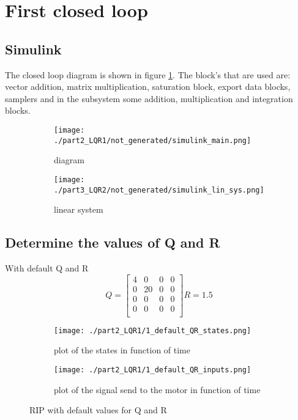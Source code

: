 \section{First closed loop}

\subsection{Simulink}
The closed loop diagram is shown in figure \ref{fig:main_simulink_part3_LQR}. The block's that are used are: vector addition, matrix multiplication, saturation block, export data blocks, samplers and in the subsystem some addition, multiplication and integration blocks.
\begin{figure}[H]
	\centering
	\begin{subfigure}[b]{0.45\textwidth}
		\texttt{[image: ./part2\_LQR1/not\_generated/simulink\_main.png]}
		\caption{diagram}
		
	\end{subfigure}
	\begin{subfigure}[b]{0.45\textwidth}
		\texttt{[image: ./part3\_LQR2/not\_generated/simulink\_lin\_sys.png]}
		\caption{linear system}
	\end{subfigure}
	\caption{}
	\label{fig:main_simulink_part3_LQR}
\end{figure}



\subsection{Determine the values of Q and R}
With default Q and R
$$
Q=\begin{bmatrix}
4 & 0 & 0 & 0 \\
0 & 20 & 0 & 0 \\
0 & 0 & 0 & 0 \\
0 & 0 & 0 & 0 \\
\end{bmatrix}
R=1.5
$$
\begin{figure}[H]
	\centering
	\begin{subfigure}[b]{0.45\textwidth}
		\texttt{[image: ./part2\_LQR1/1\_default\_QR\_states.png]}
		\caption{plot of the states in function of time}
	\end{subfigure}
	\begin{subfigure}[b]{0.45\textwidth}
		\texttt{[image: ./part2\_LQR1/1\_default\_QR\_inputs.png]}
		\caption{plot of the signal send to the motor in function of time}
	\end{subfigure}
	\caption{RIP with default values for Q and R}
	\label{fig:default}
\end{figure}

